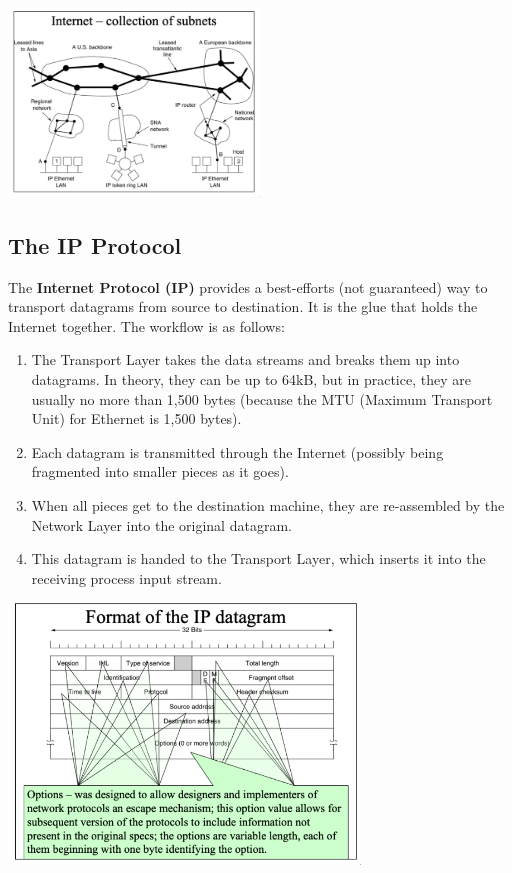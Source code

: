 \documentclass[11pt]{article}
\begin{document}
\begin{center}
    \includegraphics[width=0.5\textwidth]{internet-collectionofsubnets.png}
\end{center}

\subsection{The IP Protocol}
The \textbf{Internet Protocol (IP)} provides a best-efforts (not guaranteed) way to transport datagrams from source to 
destination.
It is the glue that holds the Internet together.
The workflow is as follows:
\begin{enumerate}
    \item   The Transport Layer takes the data streams and breaks them up into datagrams. 
            In theory, they can be up to 64kB, but in practice, they are usually no more than 1,500 bytes (because the MTU (Maximum 
            Transport Unit) for Ethernet is 1,500 bytes).
    \item   Each datagram is transmitted through the Internet (possibly being fragmented into smaller pieces as it goes).
    \item   When all pieces get to the destination machine, they are re-assembled by the Network Layer into the original 
            datagram.
    \item   This datagram is handed to the Transport Layer, which inserts it into the receiving process input stream.
\end{enumerate}

\begin{center}
    \includegraphics[width=0.7\textwidth]{formatoftheipdatagram.png}
\end{center}
\end{document}
